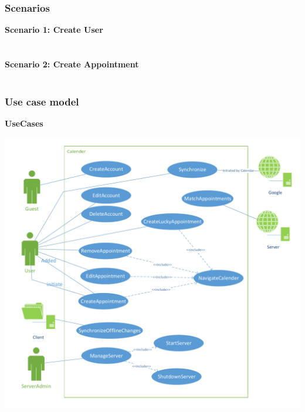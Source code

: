 \subsubsection{Scenarios}
\textbf{Scenario 1: Create User} \\
	\\\\
\textbf{Scenario 2: Create Appointment} \\
	\\

\pagebreak
\subsubsection{Use case model}
\textbf{UseCases} \\
	
	\begin{center}	
	\includegraphics[scale=0.62]{sections/3_04_system_models/UseCaseDiagram.pdf}\\
		\\[1in]
		\\[1in]
		\\
		\\[1in]
		\\
		\\[1in]
		\\
		
	\end{center}
	

